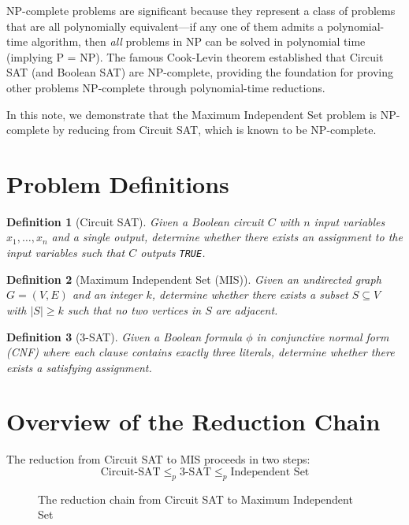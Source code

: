 \documentclass[11pt,a4paper]{article}
\newtheorem{definition}{Definition}
\begin{document}
NP-complete problems are significant because they represent a class of problems that are all polynomially equivalent---if any one of them admits a polynomial-time algorithm, then \emph{all} problems in NP can be solved in polynomial time (implying P = NP). The famous Cook-Levin theorem established that Circuit SAT (and Boolean SAT) are NP-complete, providing the foundation for proving other problems NP-complete through polynomial-time reductions.

In this note, we demonstrate that the Maximum Independent Set problem is NP-complete by reducing from Circuit SAT, which is known to be NP-complete.

\section{Problem Definitions}

\begin{definition}[Circuit SAT]
Given a Boolean circuit $C$ with $n$ input variables $x_1, \ldots, x_n$ and a single output, determine whether there exists an assignment to the input variables such that $C$ outputs \texttt{TRUE}.
\end{definition}

\begin{definition}[Maximum Independent Set (MIS)]
Given an undirected graph $G = (V, E)$ and an integer $k$, determine whether there exists a subset $S \subseteq V$ with $|S| \geq k$ such that no two vertices in $S$ are adjacent.
\end{definition}

\begin{definition}[3-SAT]
Given a Boolean formula $\phi$ in conjunctive normal form (CNF) where each clause contains exactly three literals, determine whether there exists a satisfying assignment.
\end{definition}

\section{Overview of the Reduction Chain}

The reduction from Circuit SAT to MIS proceeds in two steps:
\[
\text{Circuit-SAT} \leq_p \text{3-SAT} \leq_p \text{Independent Set}
\]

\begin{figure}[h]
\centering
{}
\caption{The reduction chain from Circuit SAT to Maximum Independent Set}
\end{figure}
\end{document}
